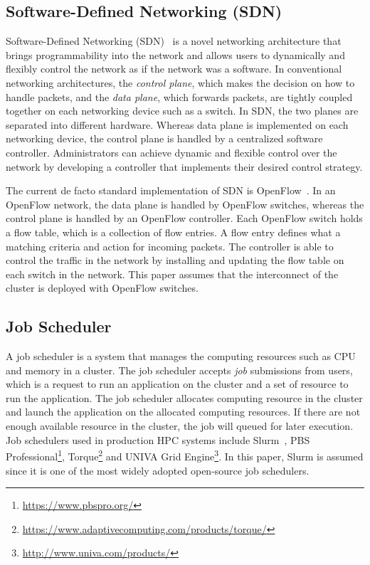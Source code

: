 \documentclass[graybox]{svmult}
\begin{document}
\subsection{Software-Defined Networking (SDN)}

Software-Defined Networking (SDN)~\cite{Jamalian2015} is a novel networking
architecture that brings programmability into the network and allows users to
dynamically and flexibly control the network as if the network was a software.
In conventional networking architectures, the \textit{control plane}, which
makes the decision on how to handle packets, and the \textit {data plane},
which forwards packets, are tightly coupled together on each networking device
such as a switch. In SDN, the two planes are separated into different
hardware. Whereas data plane is implemented on each networking device, the
control plane is handled by a centralized software controller. Administrators
can achieve dynamic and flexible control over the network by developing a
controller that implements their desired control strategy.

The current de facto standard implementation of SDN is
OpenFlow~\cite{McKeown2008}. In an OpenFlow network, the data plane is handled
by OpenFlow switches, whereas the control plane is handled by an OpenFlow
controller. Each OpenFlow switch holds a flow table, which is a collection of
flow entries. A flow entry defines what a matching criteria and action for
incoming packets. The controller is able to control the traffic in the network
by installing and updating the flow table on each switch in the network. This
paper assumes that the interconnect of the cluster is deployed with OpenFlow
switches.

\subsection{Job Scheduler}

A job scheduler is a system that manages the computing resources such as CPU
and memory in a cluster. The job scheduler accepts \textit{job} submissions
from users, which is a request to run an application on the cluster and a set
of resource to run the application. The job scheduler allocates computing
resource in the cluster and launch the application on the allocated computing
resources. If there are not enough available resource in the cluster, the job
will queued for later execution. Job schedulers used in production HPC systems
include Slurm~\cite{Yoo2003}, PBS
Professional\footnote{\url{https://www.pbspro.org/}},
Torque\footnote{\url{https://www.adaptivecomputing.com/products/torque/}} and
UNIVA Grid Engine\footnote{\url{http://www.univa.com/products/}}. In this
paper, Slurm is assumed since it is one of the most widely adopted open-source
job schedulers.
\end{document}
